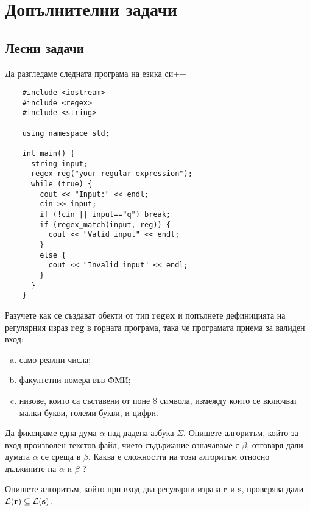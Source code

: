 \section{Допълнителни задачи}

\subsection{Лесни задачи}

\ifcode
\begin{problem}
  Да разгледаме следната програма на езика си++
  \begin{verbatim}
    #include <iostream>
    #include <regex>
    #include <string>
    
    using namespace std;
    
    int main() {
      string input;
      regex reg("your regular expression");
      while (true) {
        cout << "Input:" << endl;
        cin >> input;
        if (!cin || input=="q") break;
        if (regex_match(input, reg)) {
          cout << "Valid input" << endl;
        }  
        else {
          cout << "Invalid input" << endl;
        }
      }
    }
  \end{verbatim}
  Разучете как се създават обекти от тип {\bf regex} и попълнете дефиницията на регулярния израз {\bf reg} в горната програма, така че програмата приема за валиден вход:
  \begin{enumerate}[a)]
  \item 
    само реални числа;
  \item
    факултетни номера във ФМИ;
  \item
    низове, които са съставени от поне 8 символа, измежду които се включват малки букви, големи букви,
    и цифри.    
  \end{enumerate}
\end{problem}
\fi

\begin{problem}
  Да фиксираме една дума $\alpha$ над дадена азбука $\Sigma$.
  Опишете алгоритъм, който за вход произволен текстов файл, чието съдържание означаваме с $\beta$,
  отговаря дали думата $\alpha$ се среща в $\beta$.
  Каква е сложността на този алгоритъм относно дължините на $\alpha$ и $\beta$ ?
\end{problem}

\begin{problem}
  Опишете алгоритъм, който при вход два регулярни израза $\mathbf{r}$ и $\mathbf{s}$,
  проверява дали $\mathcal{L}(\mathbf{r}) \subseteq \mathcal{L}(\mathbf{s})$.
\end{problem}

